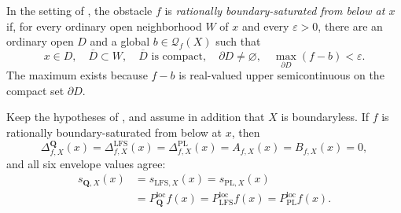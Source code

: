 \begin{definition}
\label{def:p031-rational-boundary-saturation}
In the setting of , the obstacle
$f$ is \emph{rationally boundary-saturated from below at $x$} if, for every
ordinary open neighborhood $W$ of $x$ and every $\varepsilon>0$, there are
an ordinary open $D$ and a global $b\in\mathcal Q_f(X)$ such that
\begin{equation}
\label{eq:p031-rational-boundary-saturation}
 x\in D,\quad \overline D\subset W,\quad \overline D\text{ is compact},
 \quad\partial D\ne\varnothing,
 \quad\max_{\partial D}(f-b)<\varepsilon.
\end{equation}
The maximum exists because $f-b$ is real-valued upper semicontinuous on
the compact set $\partial D$.
\end{definition}

\begin{corollary}
\label{cor:p031-rational-boundary-saturation-collapse}
Keep the hypotheses of , and assume
in addition that $X$ is boundaryless.  If $f$ is rationally
boundary-saturated from below at $x$, then
\begin{equation}
\label{eq:p031-rational-boundary-saturation-zero-ledger}
 \Delta^{\mathbf Q}_{f,X}(x)
 =\Delta^{\mathrm{LFS}}_{f,X}(x)
 =\Delta^{\mathrm{PL}}_{f,X}(x)
 =A_{f,X}(x)=B_{f,X}(x)=0,
\end{equation}
and all six envelope values agree:
\begin{equation}
\label{eq:p031-rational-boundary-saturation-collapse}
 \begin{split}
 s_{\mathbf Q,X}(x)&=s_{\mathrm{LFS},X}(x)=s_{\mathrm{PL},X}(x)\\
 &=P_{\mathbf Q}^{\mathrm{loc}}f(x)
   =P_{\mathrm{LFS}}^{\mathrm{loc}}f(x)
   =P_{\mathrm{PL}}^{\mathrm{loc}}f(x).
 \end{split}
\end{equation}
\end{corollary}

